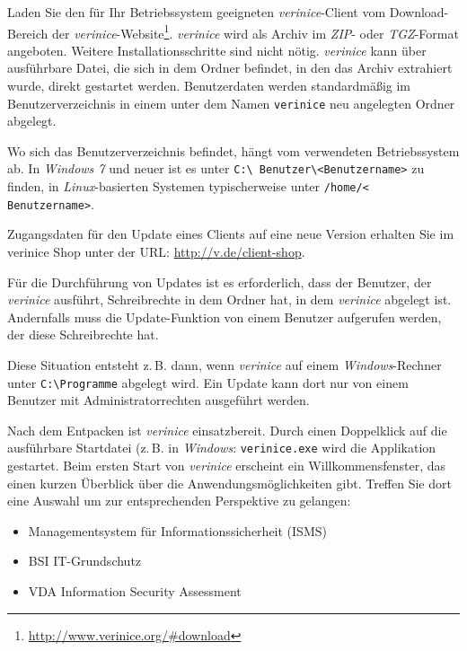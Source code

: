 \documentclass[a4paper,10pt]{book}
\newcommand{\zB}{\mbox{z.\,B.}\xspace}
\begin{document}
Laden Sie den für Ihr Betriebssystem geeigneten \textit{verinice}-Client vom
Download-Bereich der
\textit{verinice}-Website\footnote{\url{http://www.verinice.org/\#download}}.
\textit{verinice} wird als Archiv im \textit{ZIP}- oder \textit{TGZ}-Format
angeboten. Weitere Installationsschritte sind nicht nötig. \textit{verinice}
kann über ausführbare Datei, die sich in dem Ordner befindet, in den das Archiv
extrahiert wurde, direkt gestartet werden. Benutzerdaten werden standardmäßig im
Benutzerverzeichnis in einem unter dem Namen \texttt{verinice} neu angelegten
Ordner abgelegt.

Wo sich das Benutzerverzeichnis befindet, hängt vom verwendeten Betriebssystem
ab. In \textit{Windows 7} und neuer ist es unter \texttt{C:\textbackslash
Benutzer\textbackslash \textless Benutzername\textgreater} zu finden, in
\textit{Linux}-basierten Systemen typischerweise unter \texttt{/home/\textless
Benutzername\textgreater}.

Zugangsdaten für den Update eines Clients auf eine neue Version erhalten Sie im verinice Shop
unter der URL: \url{http://v.de/client-shop}.

Für die Durchführung von Updates ist es erforderlich, dass der Benutzer, der
\textit{verinice} ausführt, Schreibrechte in dem Ordner hat, in dem
\textit{verinice} abgelegt ist. Andernfalls muss die Update-Funktion von einem
Benutzer aufgerufen werden, der diese Schreibrechte hat.

Diese Situation entsteht \zB dann, wenn \textit{verinice} auf einem
\textit{Windows}-Rechner unter \texttt{C:\textbackslash Programme} abgelegt
wird. Ein Update kann dort nur von einem Benutzer mit Administratorrechten
ausgeführt werden.

Nach dem Entpacken ist \textit{verinice} einsatzbereit. Durch einen Doppelklick
auf die ausführbare Startdatei (\zB in \textit{Windows}: \texttt{verinice.exe}
wird die Applikation gestartet. Beim ersten Start von \textit{verinice}
erscheint ein Willkommensfenster, das einen kurzen Überblick über die
Anwendungsmöglichkeiten gibt. Treffen Sie dort eine Auswahl um zur
entsprechenden Perspektive zu gelangen:

\begin{itemize}
  \item Managementsystem für Informationssicherheit (ISMS)
  \item BSI IT-Grundschutz
  \item VDA Information Security Assessment
\end{itemize}
\end{document}
